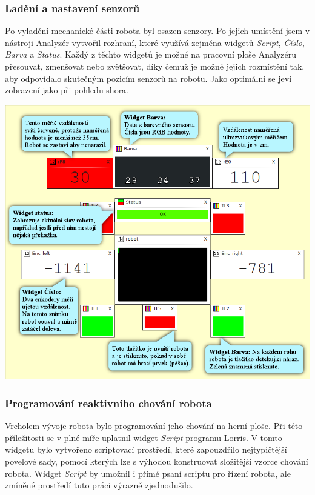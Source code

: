 \documentclass[12pt, a4paper, oneside]{article}
\newcommand{\It}{\textit}  %
\begin{document}
\newpage
\subsubsection{Ladění a nastavení senzorů}
Po vyladění mechanické části robota byl osazen senzory. Po jejich umístění jsem v nástroji Analyzér vytvořil rozhraní, které využívá zejména widgetů \It{Script}, \It{Číslo}, \It{Barva} a \It{Status}. Každý z těchto widgetů je možné na pracovní ploše Analyzéru přesouvat, zmenšovat nebo zvětšovat, díky čemuž je možné jejich rozmístění tak, aby odpovídalo skutečným pozicím senzorů na robotu. Jako optimální se jeví zobrazení jako při pohledu shora.
\vspace{10mm}
\begin{center}
\includegraphics[width=\textwidth]{img/sensors_david.png}
\end{center}

\newpage
\subsubsection{Programování reaktivního chování robota}
Vrcholem vývoje robota bylo programování jeho chování na herní ploše. Při této příležitosti se v plné míře uplatnil widget \It{Script} programu Lorris. V tomto widgetu bylo vytvořeno scriptovací prostředí, které zapouzdřilo nejtypičtější povelové sady, pomocí kterých lze s výhodou konstruovat složitější vzorce chování robota. Widget \It{Script} by umožnil i přímé psaní scriptu pro řízení robota, ale zmíněné prostředí tuto práci výrazně zjednodušilo.
\end{document}
